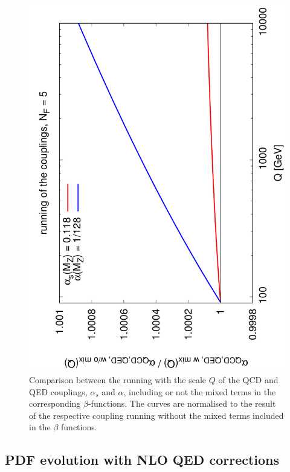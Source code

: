 \begin{figure}[h]
\centering
\includegraphics[width=0.7\columnwidth,angle=270]{figs/couplings.pdf} 
\caption{Comparison between the running with the scale
$Q$ of the QCD and QED couplings,
  $\alpha_s$ and $\alpha$, including or not the mixed terms in
  the corresponding $\beta$-functions.
%
  The curves are normalised to the result of the respective coupling
  running without the mixed terms included in the $\beta$ functions.}
\label{fig:CouplingEvol}
\end{figure}

\subsection{PDF evolution with NLO QED corrections}

